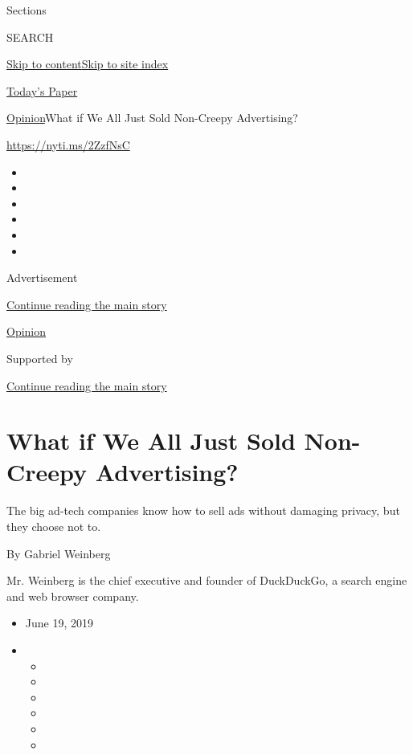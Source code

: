 Sections

SEARCH

\protect\hyperlink{site-content}{Skip to
content}\protect\hyperlink{site-index}{Skip to site index}

\href{https://myaccount.nytimes.com/auth/login?response_type=cookie\&client_id=vi}{}

\href{https://www.nytimes.com/section/todayspaper}{Today's Paper}

\href{/section/opinion}{Opinion}\textbar{}What if We All Just Sold
Non-Creepy Advertising?

\url{https://nyti.ms/2ZzfNsC}

\begin{itemize}
\item
\item
\item
\item
\item
\item
\end{itemize}

Advertisement

\protect\hyperlink{after-top}{Continue reading the main story}

\href{/section/opinion}{Opinion}

Supported by

\protect\hyperlink{after-sponsor}{Continue reading the main story}

\hypertarget{what-if-we-all-just-sold-non-creepy-advertising}{%
\section{What if We All Just Sold Non-Creepy
Advertising?}\label{what-if-we-all-just-sold-non-creepy-advertising}}

The big ad-tech companies know how to sell ads without damaging privacy,
but they choose not to.

By Gabriel Weinberg

Mr. Weinberg is the chief executive and founder of DuckDuckGo, a search
engine and web browser company.

\begin{itemize}
\item
  June 19, 2019
\item
  \begin{itemize}
  \item
  \item
  \item
  \item
  \item
  \item
  \end{itemize}
\end{itemize}

